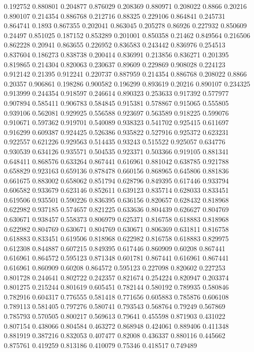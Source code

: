 0.192752 0.880801
0.204877 0.876029
0.208369 0.880971
0.208022 0.8866
0.20216 0.890107
0.214354 0.886768
0.212716 0.88325
0.229106 0.864841
0.245731 0.864741
0.1893 0.867355
0.202041 0.863045
0.205278 0.86926
0.227932 0.850609
0.24497 0.851025
0.187152 0.853289
0.201001 0.850358
0.21462 0.849564
0.216506 0.862228
0.20941 0.863655
0.226952 0.836583
0.243442 0.836976
0.254513 0.837604
0.186273 0.838738
0.200414 0.836991
0.213856 0.836271
0.201395 0.819865
0.214304 0.820063
0.230637 0.89609
0.229869 0.908028
0.224123 0.912142
0.21395 0.912241
0.220737 0.887959
0.214354 0.886768
0.208022 0.8866
0.20357 0.906861
0.198286 0.900582
0.196299 0.893619
0.20216 0.890107
0.234325 0.913999
0.244354 0.918597
0.246614 0.890323
0.253633 0.917392
0.577977 0.907894
0.585411 0.906783
0.584845 0.915381
0.578867 0.915065
0.555805 0.939106
0.562081 0.929925
0.556588 0.923697
0.563589 0.918225
0.599076 0.910671
0.597362 0.919701
0.540089 0.938323
0.541702 0.925415
0.611697 0.916299
0.609387 0.924425
0.526386 0.935822
0.527916 0.925372
0.623231 0.922557
0.621226 0.929563
0.514435 0.93243
0.515522 0.925057
0.634776 0.930539
0.634126 0.935571
0.504535 0.923371
0.503366 0.919105
0.881341 0.648411
0.868576 0.633264
0.867441 0.616961
0.881042 0.638785
0.921788 0.658829
0.923163 0.659136
0.878478 0.660156
0.868965 0.645806
0.881836 0.661675
0.883002 0.658062
0.851794 0.628796
0.849395 0.617446
0.933794 0.606582
0.933679 0.623146
0.852611 0.639123
0.835714 0.628033
0.833451 0.619506
0.935501 0.590226
0.836395 0.636156
0.820657 0.628432
0.818968 0.622982
0.937185 0.574657
0.821225 0.633636
0.804439 0.626627
0.804769 0.630671
0.938457 0.558373
0.806979 0.625371
0.816758 0.618883
0.818968 0.622982
0.804769 0.630671
0.804769 0.630671
0.806369 0.631811
0.816758 0.618883
0.833451 0.619506
0.818968 0.622982
0.816758 0.618883
0.829975 0.612308
0.844887 0.607215
0.849395 0.617446
0.860909 0.60208
0.867441 0.616961
0.864572 0.595123
0.871348 0.601781
0.867441 0.616961
0.867441 0.616961
0.860909 0.60208
0.864572 0.595123
0.227098 0.820602
0.227253 0.801728
0.244641 0.802722
0.242357 0.821674
0.254224 0.820947
0.203374 0.801275
0.215244 0.801619
0.605451 0.782144
0.580192 0.789935
0.580846 0.782916
0.604317 0.776555
0.581418 0.771656
0.605883 0.785876
0.606108 0.789113
0.581405 0.797276
0.580741 0.793543
0.568764 0.79249
0.567869 0.785793
0.570505 0.800217
0.569613 0.79641
0.455598 0.871903
0.431022 0.807154
0.438066 0.804584
0.463272 0.868948
0.424061 0.889406
0.411348 0.881919
0.387216 0.832053
0.407477 0.82008
0.436337 0.880116
0.445662 0.875761
0.419259 0.813186
0.410079 0.75346
0.418517 0.749489
